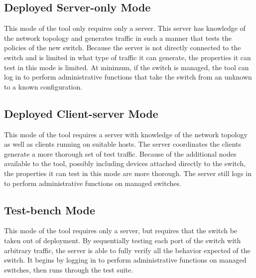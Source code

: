 \documentclass[journal]{IEEEtran}
\begin{document}
\subsection{Deployed Server-only Mode}
This mode of the tool only requires only a server. This server has knowledge of
the network topology and generates traffic in such a manner that tests the policies of the new
switch. Because the server is not directly connected to the switch and is limited in what type of
traffic it can generate, the properties it can test in this mode is limited. At minimum, if the
switch is managed, the tool can log in to perform administrative functions that take the switch
from an unknown to a known configuration.

\subsection{Deployed Client-server Mode}
This mode of the tool requires a server with knowledge of the network topology as well as clients
running on suitable hosts. The server coordinates the clients generate a more thorough set of test
traffic. Because of the additional nodes available to the tool, possibly including devices attached
directly to the switch, the properties it can test in this mode are more thorough. The server still
logs in to perform administrative functions on managed switches.

\subsection{Test-bench Mode}
This mode of the tool requires only a server, but requires that the switch be taken out of
deployment. By sequentially testing each port of the switch with arbitrary traffic, the server is
able to fully verify all the behavior expected of the switch. It begins by logging in to perform
administrative functions on managed switches, then runs through the test suite.
\end{document}
